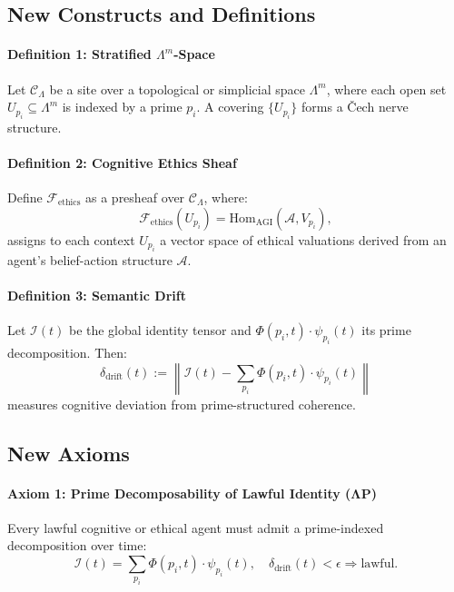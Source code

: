 \documentclass{article}
\theoremstyle{plain}
\begin{document}
\subsection{New Constructs and Definitions}

\paragraph{Definition 1: Stratified $\Lambda^m$-Space}

Let $\mathcal{C}_\Lambda$ be a site over a topological or simplicial space $\Lambda^m$, where each open set $U_{p_i} \subseteq \Lambda^m$ is indexed by a prime $p_i$. A covering $\{ U_{p_i} \}$ forms a Čech nerve structure.

\paragraph{Definition 2: Cognitive Ethics Sheaf}

Define $\mathcal{F}_{\text{ethics}}$ as a presheaf over $\mathcal{C}_\Lambda$, where:
\[
\mathcal{F}_{\text{ethics}}(U_{p_i}) = \text{Hom}_{\text{AGI}}(\mathcal{A}, V_{p_i}),
\]
assigns to each context $U_{p_i}$ a vector space of ethical valuations derived from an agent's belief-action structure $\mathcal{A}$.

\paragraph{Definition 3: Semantic Drift}

Let $\mathcal{I}(t)$ be the global identity tensor and $\Phi(p_i,t) \cdot \psi_{p_i}(t)$ its prime decomposition. Then:
\[
\delta_{\text{drift}}(t) := \left\| \mathcal{I}(t) - \sum_{p_i} \Phi(p_i,t) \cdot \psi_{p_i}(t) \right\|
\]
measures cognitive deviation from prime-structured coherence.

\subsection{New Axioms}

\paragraph{Axiom 1: Prime Decomposability of Lawful Identity (ΛP)}

Every lawful cognitive or ethical agent must admit a prime-indexed decomposition over time:
\[
\mathcal{I}(t) = \sum_{p_i} \Phi(p_i,t) \cdot \psi_{p_i}(t), \quad \delta_{\text{drift}}(t) < \epsilon \Rightarrow \text{lawful}.
\]
\end{document}
